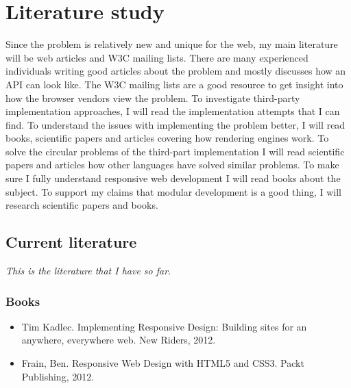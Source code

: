 \documentclass[oneside,a4paper,11pt]{kth-mag}
\begin{document}
\section*{Literature study}
Since the problem is relatively new and unique for the web, my main literature will be web articles and W3C mailing lists. There are many experienced individuals writing good articles about the problem and mostly discusses how an API can look like. The W3C mailing lists are a good resource to get insight into how the browser vendors view the problem. To investigate third-party implementation approaches, I will read the implementation attempts that I can find. To understand the issues with implementing the problem better, I will read books, scientific papers and articles covering how rendering engines work. To solve the circular problems of the third-part implementation I will read scientific papers and articles how other languages have solved similar problems. To make sure I fully understand responsive web development I will read books about the subject. To support my claims that modular development is a good thing, I will research scientific papers and books.

\subsection*{Current literature}
\emph{This is the literature that I have so far.}
\subsubsection*{Books}
\begin{itemize}
\item Tim Kadlec. Implementing Responsive Design: Building sites for an anywhere, everywhere web. New Riders, 2012.
\item Frain, Ben. Responsive Web Design with HTML5 and CSS3. Packt Publishing, 2012.
\end{itemize}
\end{document}
